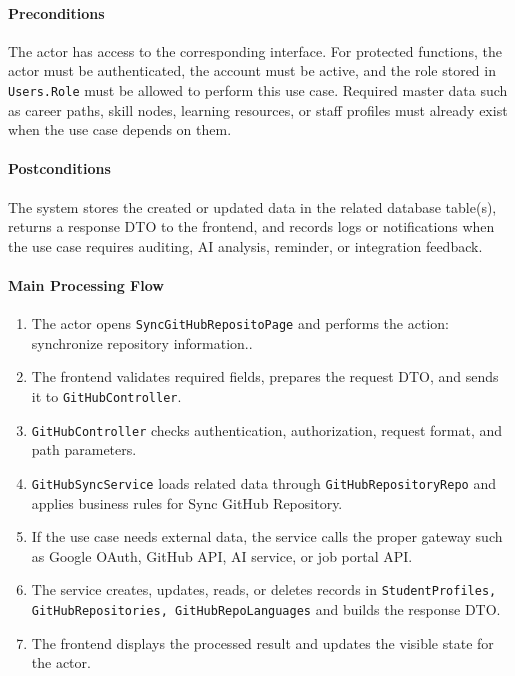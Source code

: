 \paragraph{Preconditions}

The actor has access to the corresponding interface. For protected functions, the actor must be authenticated, the account must be active, and the role stored in \texttt{Users.Role} must be allowed to perform this use case. Required master data such as career paths, skill nodes, learning resources, or staff profiles must already exist when the use case depends on them.

\paragraph{Postconditions}

The system stores the created or updated data in the related database table(s), returns a response DTO to the frontend, and records logs or notifications when the use case requires auditing, AI analysis, reminder, or integration feedback.

\paragraph{Main Processing Flow}

\begin{enumerate}
    \item The actor opens \texttt{SyncGitHubRepositoPage} and performs the action: synchronize repository information..
    \item The frontend validates required fields, prepares the request DTO, and sends it to \texttt{GitHubController}.
    \item \texttt{GitHubController} checks authentication, authorization, request format, and path parameters.
    \item \texttt{GitHubSyncService} loads related data through \texttt{GitHubRepositoryRepo} and applies business rules for Sync GitHub Repository.
    \item If the use case needs external data, the service calls the proper gateway such as Google OAuth, GitHub API, AI service, or job portal API.
    \item The service creates, updates, reads, or deletes records in \texttt{StudentProfiles, GitHubRepositories, GitHubRepoLanguages} and builds the response DTO.
    \item The frontend displays the processed result and updates the visible state for the actor.
\end{enumerate}


